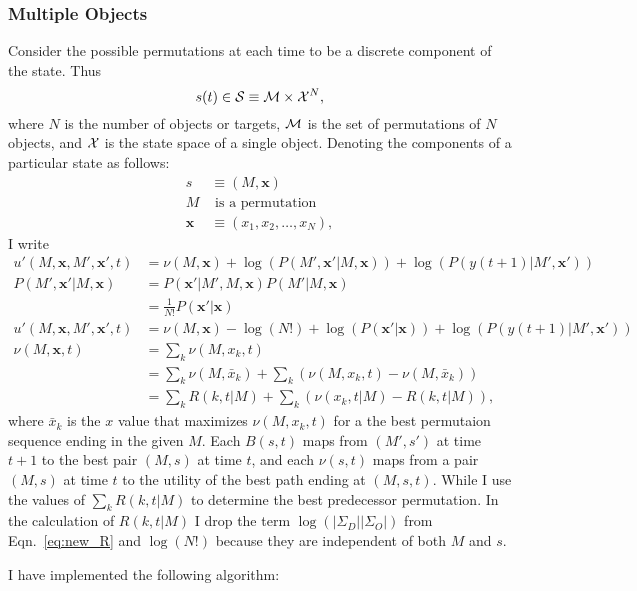 \documentclass[12pt]{article}
\newcommand{\ti}[2]{{#1}{(#2)}}                         %
\newcommand{\logdet}{\log\left(\left|\Sigma_D\right| \left| \Sigma_O
    \right| \right)}
\begin{document}
\subsubsection{Multiple Objects}
\label{sec:multiple}

Consider the possible permutations at each time to be a discrete
component of the state.  Thus
\begin{equation*}
  \ti{s}{t} \in {\cal S} \equiv {\cal M} \times {\cal X}^{N},
\end{equation*}
where $N$ is the number of objects or targets, $\cal M$ is the set of
permutations of $N$ objects, and ${\cal X}$ is the state space of a
single object.  Denoting the components of a particular state as
follows: \newcommand{\bx}{{\mathbf{x}}}
\begin{align*}
  s &\equiv (M,\bx) \\
  M & \text{ is a permutation} \\
  \bx &\equiv (x_1,x_2,\ldots,x_N),
\end{align*}
I write
\begin{align*}
  u'(M,\bx,M',\bx',t) &= \nu(M,\bx) + \log \left(
    P(M',\bx'|M,\bx)\right) + \log \left(
    P(\ti{y}{t+1}|M',\bx')\right) \\
  P(M',\bx'|M,\bx) &= P(\bx'|M',M,\bx) P(M'|M,\bx) \\
  &= \frac{1}{N!} P(\bx'|\bx) \\
  u'(M,\bx,M',\bx',t) &= \nu(M,\bx) - \log(N!) + \log \left(
    P(\bx'|\bx)\right) + \log \left( P(\ti{y}{t+1}|M',\bx')\right) \\
  \nu(M,\bx,t) &= \sum_k \nu(M,x_k,t) \\
  &= \sum_k \nu(M,\bar x_k) + \sum_k \left (\nu(M,x_k,t) - \nu(M,\bar
    x_k) \right) \\
  &= \sum_k R(k,t|M) + \sum_k \left (\nu(x_k,t|M) -  R(k,t|M) \right),
\end{align*}
where $\bar x_k$ is the $x$ value that maximizes $\nu(M,x_k,t)$ for a
the best permutaion sequence ending in the given $M$.  Each $B(s,t)$
maps from $(M',s')$ at time $t+1$ to the best pair $(M,s)$ at time
$t$, and each $\nu(s,t)$ maps from a pair $(M,s)$ at time $t$ to the
utility of the best path ending at $(M,s,t)$.  While I use the values
of $\sum_k R(k,t|M)$ to determine the best predecessor permutation.
In the calculation of $R(k,t|M)$ I drop the term $\logdet$ from
Eqn.~\eqref{eq:new_R} and $\log(N!)$ because they are independent of
both $M$ and $s$.

I have implemented the following algorithm:
\end{document}
